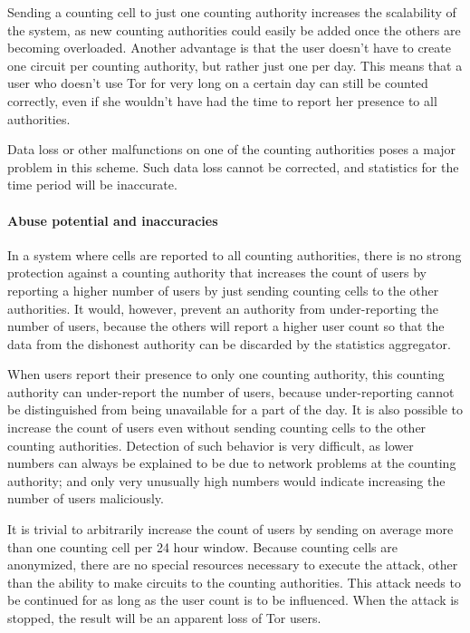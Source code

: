 \documentclass{article}
\begin{document}
Sending a counting cell to just one counting authority increases the
scalability of the system, as new counting authorities
could easily be added once the others are becoming overloaded.
Another advantage is that the user doesn't have to create one circuit
per counting authority, but rather just one per day.
This means that a user who doesn't use Tor for very long on a certain
day can still be counted correctly, even if she wouldn't have had the
time to report her presence to all authorities.


Data loss or other malfunctions on one of the counting authorities
poses a major problem in this scheme.
Such data loss cannot be corrected, and statistics for the time period
will be inaccurate.

\paragraph{Abuse potential and inaccuracies}

In a system where cells are reported to all counting authorities,
there is no strong protection against a counting authority that
increases the count of users by reporting a higher number of users by
just sending counting cells to the other authorities.
It would, however, prevent an authority from under-reporting the number
of users, because the others will report a higher user count so that
the data from the dishonest authority can be discarded by the statistics
aggregator.

When users report their presence to only one counting authority, this
counting authority can under-report the number of users,
because under-reporting cannot be distinguished from being unavailable
for a part of the day.
It is also possible to increase the count of users even without sending
counting cells to the other counting authorities.
Detection of such behavior is very difficult, as lower numbers can
always be explained to be due to network problems at the counting
authority; and only very unusually high numbers would indicate increasing
the number of users maliciously.

It is trivial to arbitrarily increase the count of users by sending on
average more than one counting cell per 24 hour window.
Because counting cells are anonymized, there are no special resources
necessary to execute the attack, other than the ability to make circuits
to the counting authorities.
This attack needs to be continued for as long as the user count is to be
influenced.
When the attack is stopped, the result will be an apparent loss of Tor
users.
\end{document}
